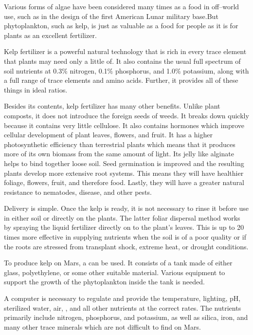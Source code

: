 Various forms of algae have been considered many times as a food in off--world use, such as in the design of the first American Lunar military base. But phytoplankton, such as kelp, is just as valuable as a food for people as it is for plants as an excellent fertilizer.

Kelp fertilizer is a powerful natural technology that is rich in every trace element that plants may need only a little of. It also contains the usual full spectrum of soil nutrients at 0.3\% nitrogen, 0.1\% phosphorus, and 1.0\% potassium, along with a full range of trace elements and amino acids. Further, it provides all of these things in ideal ratios.

Besides its contents, kelp fertilizer has many other benefits. Unlike plant composts, it does not introduce the foreign seeds of weeds. It breaks down quickly because it contains very little cellulose. It also contains hormones which improve cellular development of plant leaves, flowers, and fruit. It has a higher photosynthetic efficiency than terrestrial plants which means that it produces more of its own biomass from the same amount of light. Its jelly like alginate helps to bind together loose soil. Seed germination is improved and the resulting plants develop more extensive root systems. This means they will have healthier foliage, flowers, fruit, and therefore food. Lastly, they will have a greater natural resistance to nematodes, disease, and other pests.

Delivery is simple. Once the kelp is ready, it is not necessary to rinse it before use in either soil or directly on the plants. The latter foliar dispersal method works by spraying the liquid fertilizer directly on to the plant's leaves. This is up to 20 times more effective in supplying nutrients when the soil is of a poor quality or if the roots are stressed from transplant shock, extreme heat, or drought conditions.

To produce kelp on Mars, a  can be used. It consists of a tank made of either glass, polyethylene, or some other suitable material. Various equipment to support the growth of the phytoplankton inside the tank is needed.

A computer is necessary to regulate and provide the temperature, lighting, pH, sterilized water, air, , and all other nutrients at the correct rates. The nutrients primarily include nitrogen, phosphorus, and potassium, as well as silica, iron, and many other trace minerals which are not difficult to find on Mars. 

